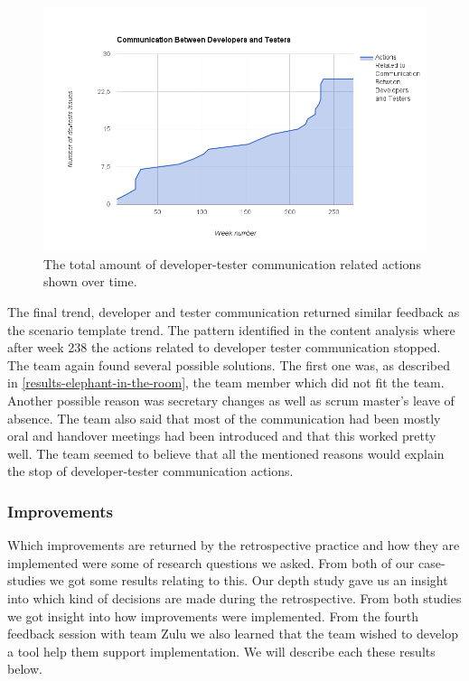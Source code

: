 \begin{figure}[!h]
	\centering
	\includegraphics[width=\textwidth, keepaspectratio]{figures/devtestcom.png}
	\caption{The total amount of developer-tester communication related actions shown over time.}
	\label{figure:dev-test-com}
\end{figure}
\afterpage{\clearpage}

The final trend, developer and tester communication returned similar feedback as the scenario template trend. The pattern identified in the content analysis where after week 238 the actions related to developer tester communication stopped. The team again found several possible solutions. The first one was, as described in \autoref{results-elephant-in-the-room}, the team member which did not fit the team. Another possible reason was secretary changes as well as scrum master's leave of absence. The team also said that most of the communication had been mostly oral and handover meetings had been introduced and that this worked pretty well. The team seemed to believe that all the mentioned reasons would explain the stop of developer-tester communication actions. 

\subsubsection{Improvements}
Which improvements are returned by the retrospective practice and how they are implemented were some of research questions we asked. From both of our case-studies we got some results relating to this. Our depth study gave us an insight into which kind of decisions are made during the retrospective. From both studies we got insight into how improvements were implemented. From the fourth feedback session with team Zulu we also learned that the team wished to develop a tool help them support implementation. We will describe each these results below.

